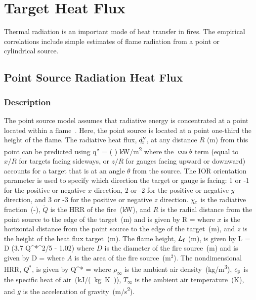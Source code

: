 
\chapter{Target Heat Flux}
\label{Target_Heat_Flux_Chapter}

Thermal radiation is an important mode of heat transfer in fires. The empirical correlations include simple estimates of flame radiation from a point or cylindrical source.

\section{Point Source Radiation Heat Flux}

\subsection*{Description}

The point source model assumes that radiative energy is concentrated at a point located within a flame~\cite{Beyler2:SFPE}.
Here, the point source is located at a point one-third the height of the flame.
The radiative heat flux, $\dot q''\sb{r}$, at any distance $R$ (\si{m}) from this point can be predicted using
\be
\dot q'' = \cos\theta \left(  \right) \quad \si{kW/m^2}
\label{eq:point_source}
\ee
where the $\cos\theta$ term (equal to $x/R$ for targets facing sideways, or $z/R$ for gauges facing upward or downward) accounts for a target that is at an angle $\theta$ from the source. The IOR orientation parameter is used to specify which direction the target or gauge is facing: 1 or -1 for the positive or negative $x$ direction, 2 or -2 for the positive or negative $y$ direction, and 3 or -3 for the positive or negative $z$ direction. $\chi\sb{r}$ is the radiative fraction~(-), $\dot Q$ is the HRR of the fire~(\si{kW}), and $R$ is the radial distance from the point source to the edge of the target~(\si{m}) and is given by
\be
R = 
\label{eq:point_source_R}
\ee
where $x$ is the horizontal distance from the point source to the edge of the target~(\si{m}), and $z$ is the height of the heat flux target~(\si{m}). The flame height, $L\sb{f}$ (\si{m}), is given by
\be
L = D (3.7 Q^{*^{2/5}} - 1.02)
\label{eq:point_source_Lf}
\ee
where $D$ is the diameter of the fire source~(\si{m}) and is given by
\be
D = 
\label{eq:point_source_D}
\ee
where $A$ is the area of the fire source~(m$^2$). The nondimensional HRR, $Q^*$, is given by
\be
Q^* = 
\label{eq:point_source_Qstar}
\ee
where $\rho_\infty$ is the ambient air density~(\si{kg/m^3}), $c\sb{p}$ is the specific heat of air~(\si{kJ/(kg.K)}), $T_\infty$ is the ambient air temperature~(\si{K}), and $g$ is the acceleration of gravity~(\si{m/s^2}).

